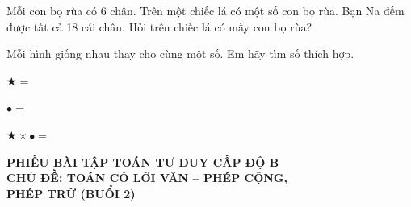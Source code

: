 \documentclass[../main.tex]{subfiles}
\begin{document}
\begin{bt}
    Mỗi con bọ rùa có 6 chân. Trên một chiếc lá có một số con bọ rùa. Bạn Na đếm được tất cả 18 cái chân. Hỏi trên chiếc lá có mấy con bọ rùa?
\end{bt}

\begin{bt}
    Mỗi hình giống nhau thay cho cùng một số. Em hãy tìm số thích hợp.
    \par\nopagebreak\vspace{6pt}
    \vspace{8pt}
    \begin{listEX}
        \item $\bigstar =$ \TTcham[1.5cm]
        \item $\bullet =$ \TTcham[1.5cm]
        \item $\bigstar \times \bullet =$ \TTcham[1.5cm]
    \end{listEX}
\end{bt}


\newpage
\TTdatlaibai
{\centering
        {\color{mauchinh!120}\bfseries\Large PHIẾU BÀI TẬP TOÁN TƯ DUY CẤP ĐỘ B}\\[3pt]
        {\color{mauchinh!120}\bfseries\Large CHỦ ĐỀ: TOÁN CÓ LỜI VĂN -- PHÉP CỘNG,\\[2pt] PHÉP TRỪ (BUỔI 2)}\par}
\vspace{6pt}
\TTthongtin
\providecommand{\TTdien}{}\renewcommand{\TTdien}[2]{\hfill\makebox[0.9cm][r]{$#1$}\TTo\makebox[0.75cm][l]{$#2$}\makebox[0.45cm]{$=$}\TTcham[1.6cm]}
\providecommand{\TTluoilon}{}\renewcommand{\TTluoilon}{\tikz{%
  \draw[black!20,line width=0.3pt,step=2mm] (0,0) grid (3.2,3.2);%
  \draw[black!55,line width=0.5pt,step=8mm] (0,0) grid (3.2,3.2);%
  \draw[black!55,line width=0.5pt] (0,0) rectangle (3.2,3.2);}}
\end{document}
